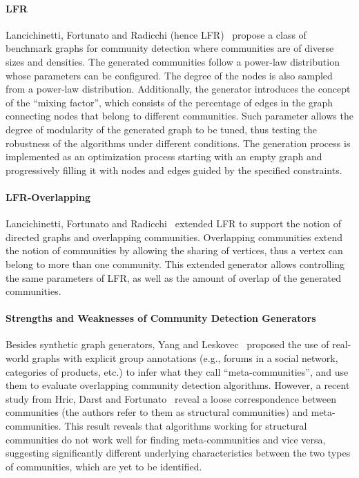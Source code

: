 \paragraph{LFR} Lancichinetti, Fortunato
and Radicchi (hence LFR)~\cite{PhysRevE.78.046110} propose a class of benchmark
graphs for community detection where communities are of diverse sizes and
densities. The generated communities follow a power-law distribution whose parameters can be configured. The degree of the
nodes is also sampled from a power-law distribution. Additionally, the generator
introduces the concept of the ``mixing factor'', which consists of the percentage of
edges in the graph connecting nodes that belong to different communities. Such parameter
allows  the degree of modularity of the generated graph  to be tuned, thus
testing the robustness of the algorithms under different conditions. The
generation process is implemented as an optimization process starting with an empty graph and 
progressively filling it with nodes and edges guided by the specified constraints.

\paragraph{LFR-Overlapping} Lancichinetti, Fortunato and
Radicchi~\cite{PhysRevE.80.016118} extended LFR to support the notion of
directed graphs and overlapping communities. Overlapping communities extend the
notion of communities by allowing the sharing of vertices, thus a vertex can
belong to more than one community. This extended generator allows controlling
the same parameters of LFR, as well as the amount of overlap of
the generated communities.

\paragraph{Strengths and Weaknesses of Community Detection Generators}
Besides synthetic graph generators, Yang and Leskovec~\cite{yang2015defining}
proposed the use of real-world graphs with explicit group annotations (e.g.,
forums in a social network, categories of products, etc.) to infer what they
call ``meta-communities'', and use them to evaluate overlapping community
detection algorithms. However, a recent study from Hric, Darst and
Fortunato~\cite{hric2014community} reveal a loose correspondence between
communities (the authors refer to them as structural communities) and
meta-communities.  This result reveals that  algorithms working for structural
communities do not work well for finding meta-communities and vice versa,
suggesting significantly different underlying characteristics
between the two types of communities, which are yet to be
identified.


